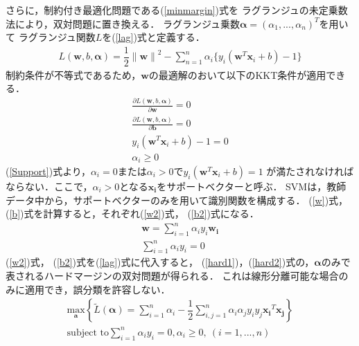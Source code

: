 さらに，制約付き最適化問題である(\ref{minmargin})式を
ラグランジュの未定乗数法により，双対問題に置き換える．
ラグランジュ乗数$\boldsymbol{\alpha} = (\alpha_1,...,\alpha_n)^T$を用いて
ラグランジュ関数$L$を(\ref{lag})式と定義する．
\begin{align}
    \label{lag}
    L(\boldsymbol{w},b,\boldsymbol{\alpha}) 
    = \dfrac{1}{2}{\|\boldsymbol{{w}}\|}^2
    - \sum_{n = 1}^{n} \alpha_i \{y_i(\boldsymbol{w}^T \boldsymbol{x}_i + b)-1\}
\end{align}
制約条件が不等式であるため，$\boldsymbol{w}$の最適解のおいて以下のKKT条件が適用できる．
\begin{subequations}
\begin{align}
   \frac{\partial L(\boldsymbol{w},b,\boldsymbol{\alpha})}{\partial \boldsymbol{w}} = 0\label{w}\\
    \frac{\partial L(\boldsymbol{w},b,\boldsymbol{\alpha})}{\partial \boldsymbol{b}} = 0\label{b}\\
    y_i(\boldsymbol{w}^T \boldsymbol{x}_i + b)-1 = 0\label{Support}\\
    \alpha_i \geq 0
\end{align}
\end{subequations}
(\ref{Support})式より，$\alpha_i = 0$または$\alpha_i > 0$で$y_i(\boldsymbol{w}^T \boldsymbol{x}_i + b)=1$
が満たされなければならない．ここで，$\alpha_i > 0$となる$\boldsymbol{x_i}$をサポートベクターと呼ぶ．
SVMは，教師データ中から，サポートベクターのみを用いて識別関数を構成する．
 (\ref{w})式， (\ref{b})式を計算すると，それぞれ(\ref{w2})式， (\ref{b2})式になる．
 \begin{subequations}
 \begin{align}
   \boldsymbol{w} = \sum_{i=1}^{n}\alpha_i y_i \boldsymbol{w_i} \label{w2}\\
   \sum_{i=1}^{n}\alpha_i y_i = 0 \label{b2}
 \end{align}
\end{subequations}
(\ref{w2})式， (\ref{b2})式を(\ref{lag})式に代入すると，
(\ref{hard1})，(\ref{hard2})式の，$\boldsymbol{\alpha}$のみで表されるハードマージンの双対問題が得られる．
これは線形分離可能な場合のみに適用でき，誤分類を許容しない．
\begin{subequations}
\begin{align}
    \underset{\boldsymbol{a}}{\text{max}} \left\{\tilde{L}(\boldsymbol{\alpha}) 
    = \sum_{i=1}^{n}\alpha_i - \dfrac{1}{2}\sum_{i,j=1}^{n}\label{hard1}
    \alpha_i\alpha_j y_i y_j \boldsymbol{x_i}^T \boldsymbol{x_j}\right\}  \\
    \text{subject to} \sum_{i=1}^{n}\alpha_i y_i = 0, \alpha_i \geq 0,\ (i=1,...,n)\label{hard2}
\end{align}
\end{subequations}

